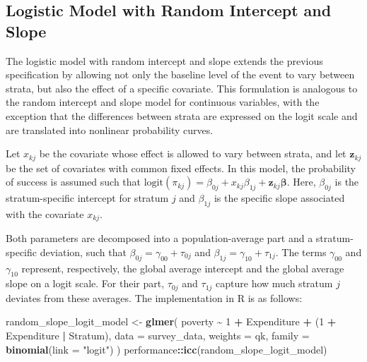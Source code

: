 \documentclass[
  english,
  12pt,
]{book}
\newenvironment{Shaded}{\begin{snugshade}}{\end{snugshade}}
\newcommand{\AttributeTok}[1]{\textcolor[rgb]{0.13,0.29,0.53}{#1}}
\newcommand{\DecValTok}[1]{\textcolor[rgb]{0.00,0.00,0.81}{#1}}
\newcommand{\FunctionTok}[1]{\textcolor[rgb]{0.13,0.29,0.53}{\textbf{#1}}}
\newcommand{\NormalTok}[1]{#1}
\newcommand{\OtherTok}[1]{\textcolor[rgb]{0.56,0.35,0.01}{#1}}
\newcommand{\SpecialCharTok}[1]{\textcolor[rgb]{0.81,0.36,0.00}{\textbf{#1}}}
\newcommand{\StringTok}[1]{\textcolor[rgb]{0.31,0.60,0.02}{#1}}
\begin{document}
\subsection{Logistic Model with Random Intercept and Slope}\label{modelo-logistico-con-intercepto-y-pendiente-aleatoria}

The logistic model with random intercept and slope extends the previous specification by allowing not only the baseline level of the event to vary between strata, but also the effect of a specific covariate. This formulation is analogous to the random intercept and slope model for continuous variables, with the exception that the differences between strata are expressed on the logit scale and are translated into nonlinear probability curves.

Let \(x_{kj}\) be the covariate whose effect is allowed to vary between strata, and let \(\mathbf{z}_{kj}\) be the set of covariates with common fixed effects. In this model, the probability of success is assumed such that \(\text{logit}(\pi_{kj}) = \beta_{0j} + x_{kj}\beta_{1j} + \mathbf{z}_{kj}\boldsymbol{\beta}\). Here, \(\beta_{0j}\) is the stratum-specific intercept for stratum \(j\) and \(\beta_{1j}\) is the specific slope associated with the covariate \(x_{kj}\).

Both parameters are decomposed into a population-average part and a stratum-specific deviation, such that \(\beta_{0j} = \gamma_{00} + \tau_{0j}\) and \(\beta_{1j} = \gamma_{10} + \tau_{1j}\). The terms \(\gamma_{00}\) and \(\gamma_{10}\) represent, respectively, the global average intercept and the global average slope on a logit scale. For their part, \(\tau_{0j}\) and \(\tau_{1j}\) capture how much stratum \(j\) deviates from these averages. The implementation in R is as follows:

\begin{Shaded}
\begin{Highlighting}[]
\NormalTok{random\_slope\_logit\_model }\OtherTok{\textless{}{-}} \FunctionTok{glmer}\NormalTok{(}
\NormalTok{  poverty }\SpecialCharTok{\textasciitilde{}} \DecValTok{1} \SpecialCharTok{+}\NormalTok{ Expenditure }\SpecialCharTok{+}\NormalTok{ (}\DecValTok{1} \SpecialCharTok{+}\NormalTok{ Expenditure }\SpecialCharTok{|}\NormalTok{ Stratum),}
  \AttributeTok{data =}\NormalTok{ survey\_data,}
  \AttributeTok{weights =}\NormalTok{ qk,}
  \AttributeTok{family =} \FunctionTok{binomial}\NormalTok{(}\AttributeTok{link =} \StringTok{"logit"}\NormalTok{)}
\NormalTok{)}
\NormalTok{performance}\SpecialCharTok{::}\FunctionTok{icc}\NormalTok{(random\_slope\_logit\_model)}
\end{Highlighting}
\end{Shaded}
\end{document}
